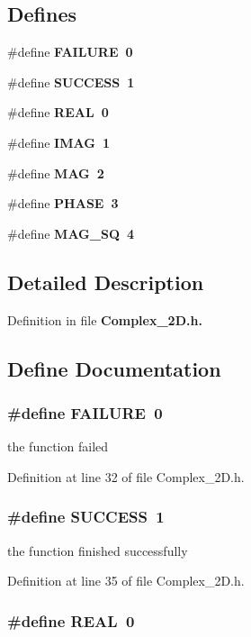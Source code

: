 \subsection*{Defines}
\begin{CompactItemize}
\item 
\#define \bf{FAILURE}~0
\item 
\#define \bf{SUCCESS}~1
\item 
\#define \bf{REAL}~0
\item 
\#define \bf{IMAG}~1
\item 
\#define \bf{MAG}~2
\item 
\#define \bf{PHASE}~3
\item 
\#define \bf{MAG\_\-SQ}~4
\end{CompactItemize}


\subsection{Detailed Description}


Definition in file \bf{Complex\_\-2D.h}.

\subsection{Define Documentation}
\subsubsection{\setlength{\rightskip}{0pt plus 5cm}\#define FAILURE~0}\label{Complex__2D_8h_bbb472742c04f963c42893209fc25a99}


the function failed 

Definition at line 32 of file Complex\_\-2D.h.
\subsubsection{\setlength{\rightskip}{0pt plus 5cm}\#define SUCCESS~1}\label{Complex__2D_8h_f5b270a7f68ce2ff7f4ddeb8dfe35550}


the function finished successfully 

Definition at line 35 of file Complex\_\-2D.h.
\subsubsection{\setlength{\rightskip}{0pt plus 5cm}\#define REAL~0}\label{Complex__2D_8h_73aacd4e78f040415d71422e3c30baf5}


